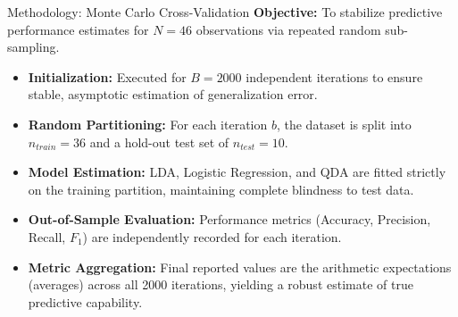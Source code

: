 \documentclass[8pt, aspectratio=169]{beamer}
\begin{document}
\begin{frame}{Methodology: Monte Carlo Cross-Validation}
    \textbf{Objective:} To stabilize predictive performance estimates for $N=46$ observations via repeated random sub-sampling.
    
    \begin{itemize}
        \item \textbf{Initialization:} Executed for $B = 2000$ independent iterations to ensure stable, asymptotic estimation of generalization error.
        \item \textbf{Random Partitioning:} For each iteration $b$, the dataset is split into $n_{train} = 36$ and a hold-out test set of $n_{test} = 10$.
        \item \textbf{Model Estimation:} LDA, Logistic Regression, and QDA are fitted strictly on the training partition, maintaining complete blindness to test data.
        \item \textbf{Out-of-Sample Evaluation:} Performance metrics (Accuracy, Precision, Recall, $F_1$) are independently recorded for each iteration.
        \item \textbf{Metric Aggregation:} Final reported values are the arithmetic expectations (averages) across all 2000 iterations, yielding a robust estimate of true predictive capability.
    \end{itemize}
\end{frame}
\end{document}
